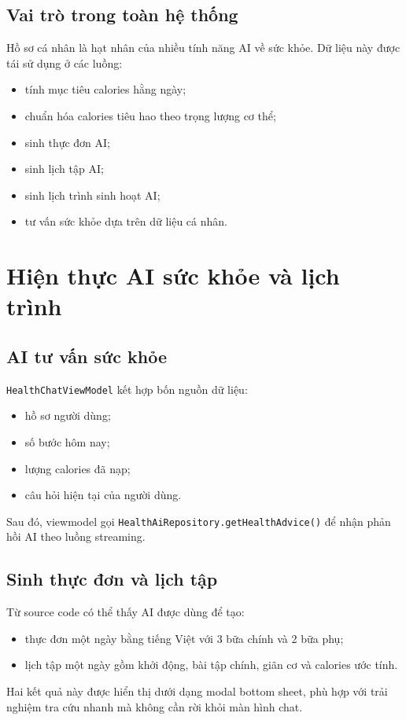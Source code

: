 \documentclass{zenbuddy-report}
\begin{document}
\subsection{Vai trò trong toàn hệ thống}
Hồ sơ cá nhân là hạt nhân của nhiều tính năng AI về sức khỏe. Dữ liệu này được tái sử dụng ở các luồng:
\begin{itemize}
  \item tính mục tiêu calories hằng ngày;
  \item chuẩn hóa calories tiêu hao theo trọng lượng cơ thể;
  \item sinh thực đơn AI;
  \item sinh lịch tập AI;
  \item sinh lịch trình sinh hoạt AI;
  \item tư vấn sức khỏe dựa trên dữ liệu cá nhân.
\end{itemize}

\section{Hiện thực AI sức khỏe và lịch trình}
\subsection{AI tư vấn sức khỏe}
\texttt{HealthChatViewModel} kết hợp bốn nguồn dữ liệu:
\begin{itemize}
  \item hồ sơ người dùng;
  \item số bước hôm nay;
  \item lượng calories đã nạp;
  \item câu hỏi hiện tại của người dùng.
\end{itemize}

Sau đó, viewmodel gọi \texttt{HealthAiRepository.getHealthAdvice()} để nhận phản hồi AI theo luồng streaming.


\subsection{Sinh thực đơn và lịch tập}
Từ source code có thể thấy AI được dùng để tạo:
\begin{itemize}
  \item thực đơn một ngày bằng tiếng Việt với 3 bữa chính và 2 bữa phụ;
  \item lịch tập một ngày gồm khởi động, bài tập chính, giãn cơ và calories ước tính.
\end{itemize}
Hai kết quả này được hiển thị dưới dạng modal bottom sheet, phù hợp với trải nghiệm tra cứu nhanh mà không cần rời khỏi màn hình chat.
\end{document}
